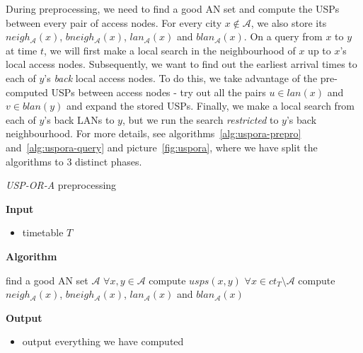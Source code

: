 	During preprocessing, we need to find a good AN set and compute the USPs between every pair of access nodes. For every city $x \not \in \mathcal{A}$, we also store its $neigh_{\mathcal{A}}(x)$, $bneigh_{\mathcal{A}}(x)$, $lan_{\mathcal{A}}(x)$ and $blan_{\mathcal{A}}(x)$. On a query from $x$ to $y$ at time $t$, we will first make a local search in the neighbourhood of $x$ up to $x$'s local access nodes. Subsequently, we want to find out the earliest arrival times to each of $y$'s \textit{back} local access nodes. To do this, we take advantage of the pre-computed USPs between access nodes - try out all the pairs $u \in lan(x)$ and $v \in blan(y)$ and expand the stored USPs. Finally, we make a local search from each of $y$'s back LANs to $y$, but we run the search \textit{restricted} to $y$'s back neighbourhood. For more details, see algorithms~\ref{alg:uspora-prepro} and~\ref{alg:uspora-query} and picture~\ref{fig:uspora}, where we have split the algorithms to 3 distinct phases.
	
	\color{algcolor}
	\begin{algorithm}[H]
		\color{inalgcolor}
		\caption{\textit{USP-OR-A} preprocessing}
		\label{alg:uspora-prepro}
		\textbf{Input} 
		\begin{itemize}
			\item timetable $T$
		\end{itemize}
		\textbf{Algorithm}
		\begin{algorithmic}
			\STATE find a good AN set $\mathcal{A}$
			\STATE $\forall x, y \in \mathcal{A}$ compute $usps(x, y)$
			\STATE $\forall x \in ct_{T} \setminus \mathcal{A}$ compute $neigh_{\mathcal{A}}(x)$, $bneigh_{\mathcal{A}}(x)$, $lan_{\mathcal{A}}(x)$ and $blan_{\mathcal{A}}(x)$
		\end{algorithmic}
		\textbf{Output}
		\begin{itemize}
			\item output everything we have computed
		\end{itemize}
	\end{algorithm}
	\color{black}
	

